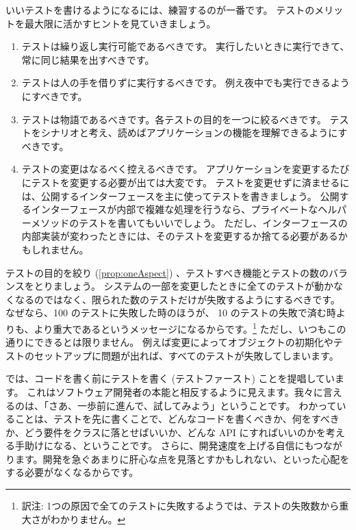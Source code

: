 \documentclass[a4paper,10pt,twoside]{book}
\begin{document}
いいテストを書けるようになるには、練習するのが一番です。
テストのメリットを最大限に活かすヒントを見ていきましょう。

\begin{enumerate}
\item テストは繰り返し実行可能であるべきです。
  実行したいときに実行できて、常に同じ結果を出すべきです。

\item テストは人の手を借りずに実行するべきです。
  例え夜中でも実行できるようにすべきです。

\item テストは物語であるべきです。各テストの目的を一つに絞るべきです。
  テストをシナリオと考え、読めばアプリケーションの機能を理解できるようにすべきです。 \label{prop:oneAspect}

\item テストの変更はなるべく控えるべきです。
  アプリケーションを変更するたびにテストを変更する必要が出ては大変です。
  テストを変更せずに済ませるには、公開するインターフェースを主に使ってテストを書きましょう。
  公開するインターフェースが内部で複雑な処理を行うなら、プライベートなヘルパーメソッドのテストを書いてもいいでしょう。
  ただし、インターフェースの内部実装が変わったときには、そのテストを変更するか捨てる必要があるかもしれません。

\end{enumerate}

テストの目的を絞り (\ref{prop:oneAspect}) 、テストすべき機能とテストの数のバランスをとりましょう。
システムの一部を変更したときに全てのテストが動かなくなるのではなく、限られた数のテストだけが失敗するようにするべきです。
なぜなら、100 のテストに失敗した時のほうが、 10 のテストの失敗で済む時よりも、より重大であるというメッセージになるからです。\footnote{訳注: 1つの原因で全てのテストに失敗するようでは、テストの失敗数から重大さがわかりません。}
ただし、いつもこの通りにできるとは限りません。
例えば変更によってオブジェクトの初期化やテストのセットアップに問題が出れば、すべてのテストが失敗してしまいます。

 では、コードを書く前にテストを書く (テストファースト) ことを提唱しています。
これはソフトウェア開発者の本能と相反するように見えます。我々に言えるのは、「さあ、一歩前に進んで、試してみよう」ということです。 
わかっていることは、テストを先に書くことで、どんなコードを書くべきか、何をすべきか、どう要件をクラスに落とせばいいか、どんな API にすればいいのかを考える手助けになる、ということです。
さらに、開発速度を上げる自信にもつながります。開発を急ぐあまりに肝心な点を見落とすかもしれない、といった心配をする必要がなくなるからです。
\end{document}
